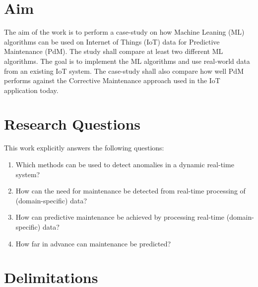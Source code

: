 \section{Aim}
\label{sec:aim}
The aim of the work is to perform a case-study on how Machine Leaning (ML) algorithms can be used on Internet of Things (IoT) data for Predictive Maintenance (PdM).
The study shall compare at least two different ML algorithms.
The goal is to implement the ML algorithms and use real-world data from an existing IoT system.
The case-study shall also compare how well PdM performs against the Corrective Maintenance approach used in the IoT application today.


\section{Research Questions}
\label{sec:research-questions}
This work explicitly answers the following questions:
\begin{enumerate}
  \item Which methods can be used to detect anomalies in a dynamic real-time system?
  \item How can the need for maintenance be detected from real-time processing of (domain-specific) data?
  \item How can predictive maintenance be achieved by processing real-time (domain-specific) data?
  \item How far in advance can maintenance be predicted?
\end{enumerate}

\section{Delimitations}
\label{sec:delimitations}
